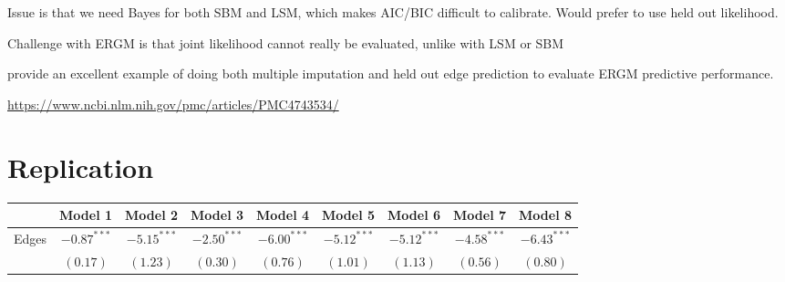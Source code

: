 \documentclass[fleqn,12pt]{wlscirep}
\begin{document}
Issue is that we need Bayes for both SBM and LSM, which makes AIC/BIC difficult to calibrate. Would prefer to use held out likelihood.

Challenge with ERGM is that joint likelihood cannot really be evaluated, unlike with LSM or SBM

\citet{wang2016multiple} provide an excellent example of doing both multiple imputation and held out edge prediction to evaluate ERGM predictive performance.

\url{https://www.ncbi.nlm.nih.gov/pmc/articles/PMC4743534/}

\section{Replication}


\clearpage
\begin{landscape}
\begin{table}
\begin{center}
\begin{tabular}{l c c c c c c c c }
\hline
 & Model 1 & Model 2 & Model 3 & Model 4 & Model 5 & Model 6 & Model 7 & Model 8 \\
\hline
Edges                   & $-0.87^{***}$ & $-5.15^{***}$ & $-2.50^{***}$ & $-6.00^{***}$ & $-5.12^{***}$ & $-5.12^{***}$ & $-4.58^{***}$ & $-6.43^{***}$ \\
                        & $(0.17)$      & $(1.23)$      & $(0.30)$      & $(0.76)$      & $(1.01)$      & $(1.13)$      & $(0.56)$      & $(0.80)$      \\
        

\end{tabular}
\end{center}
\end{table}
\end{landscape}
\end{document}
